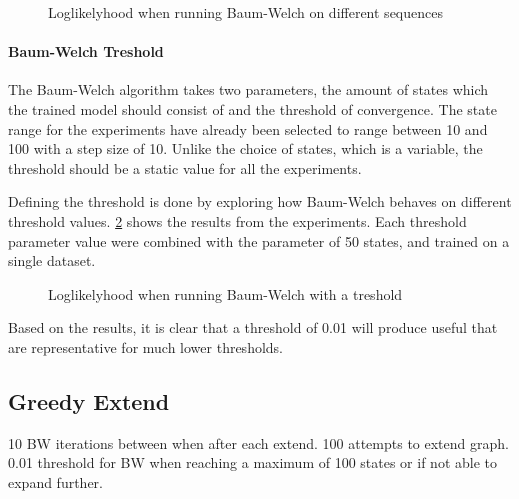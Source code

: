 \begin{figure}
\centering
\caption{Loglikelyhood when running Baum-Welch on different sequences}
\label{fig:sequences}
\end{figure}


\paragraph{Baum-Welch Treshold}
The Baum-Welch algorithm takes two parameters, the amount of states which the trained model should consist of and the threshold of convergence. The state range for the experiments have already been selected to range between 10 and 100 with a step size of 10. Unlike the choice of states, which is a variable, the threshold should be a static value for all the experiments.

Defining the threshold is done by exploring how Baum-Welch behaves on different threshold values. \ref{fig:threshold} shows the results from the experiments. Each threshold parameter value were combined with the parameter of 50 states, and trained on a single dataset.

\begin{figure}
\centering
\caption{Loglikelyhood when running Baum-Welch with a treshold}
\label{fig:threshold}
\end{figure}

Based on the results, it is clear that a threshold of 0.01 will produce useful that are representative for much lower thresholds.

\subsection{Greedy Extend}
10 BW iterations between when after each extend.
100 attempts to extend graph.
0.01 threshold for BW when reaching a maximum of 100 states or if not able to expand further.

